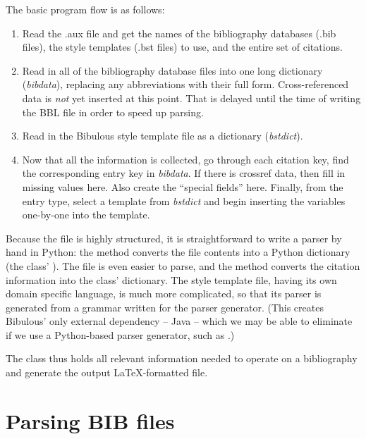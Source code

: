 \documentclass[letterpaper,10pt,english]{sphinxmanual}
\begin{document}
The basic program flow is as follows:
\begin{enumerate}
\item {} 
Read the .aux file and get the names of the bibliography databases (.bib files), the style templates (.bst files) to use, and the entire set of citations.

\item {} 
Read in all of the bibliography database files into one long dictionary (\emph{bibdata}), replacing any abbreviations with their full form. Cross-referenced data is \emph{not} yet inserted at this point. That is delayed until the time of writing the BBL file in order to speed up parsing.

\item {} 
Read in the Bibulous style template file as a dictionary (\emph{bstdict}).

\item {} 
Now that all the information is collected, go through each citation key, find the corresponding entry key in \emph{bibdata}. If there is crossref data, then fill in missing values here. Also create the ``special fields'' here. Finally, from the entry type, select a template from \emph{bstdict} and begin inserting the variables one-by-one into the template.

\end{enumerate}

Because the  file is highly structured, it is straightforward to write a parser by hand in Python: the  method converts the  file contents into a Python dictionary (the  class' ). The  file is even easier to parse, and the  method converts the citation information into the  class'  dictionary. The  style template file, having its own domain specific language, is much more complicated, so that its parser is generated from a grammar written for the  parser generator. (This creates Bibulous' only external dependency -- Java -- which we may be able to eliminate if we use a Python-based parser generator, such as .)

The  class thus holds all relevant information needed to operate on a bibliography and generate the output LaTeX-formatted  file.


\section{Parsing BIB files}
\label{developer_guide:parsing-bib-files}
\end{document}
